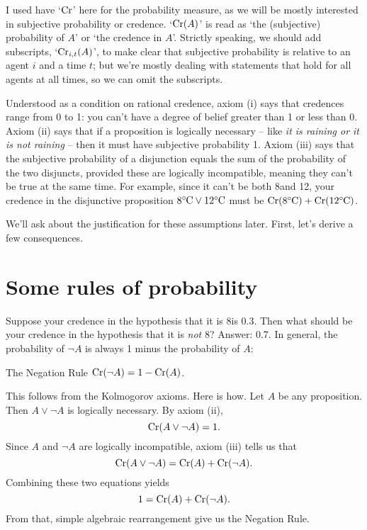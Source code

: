 I used have `$\Cr$' here for the probability measure, as we will be mostly
interested in subjective probability or credence. `$\Cr(A)$' is read as `the
(subjective) probability of $A$' or `the credence in $A$'. Strictly speaking, we
should add subscripts, `$\Cr_{i,t}(A)$', to make clear that subjective
probability is relative to an agent $i$ and a time $t$; but we're mostly dealing
with statements that hold for all agents at all times, so we can omit the
subscripts.

Understood as a condition on rational credence, axiom (i) says that credences
range from 0 to 1: you can't have a degree of belief greater than 1 or less than
0. Axiom (ii) says that if a proposition is logically necessary -- like \emph{it
  is raining or it is not raining} -- then it must have subjective probability
1. Axiom (iii) says that the subjective probability of a disjunction
equals the sum of the probability of the two disjuncts, provided these are
logically incompatible, meaning they can't be true at the same time. For
example, since it can't be both 8\celsius and 12\celsius, your credence in the
disjunctive proposition $8\celsius \lor 12\celsius$ must be
$\Cr(\text{8\celsius}) + \Cr(\text{12\celsius})$.

We'll ask about the justification for these assumptions later. First,
let's derive a few consequences.


\section{Some rules of probability}

Suppose your credence in the hypothesis that it is 8\celsius is
0.3. Then what should be your credence in the hypothesis that it is
\emph{not} 8\celsius? Answer: 0.7. In general, the probability of
$\neg A$ is always 1 minus the probability of $A$:

\begin{genericthm}{The Negation Rule}
  $\Cr(\neg A) = 1 - \Cr(A)$.
\end{genericthm}

This follows from the Kolmogorov axioms. Here is how. Let $A$ be any
proposition. Then $A \lor \neg A$ is logically necessary. By axiom (ii),
\[
  \Cr(A \lor \neg A) = 1.
\]
Since  $A$ and $\neg A$ are logically incompatible, axiom (iii) tells us that
\[
  \Cr(A \lor \neg A) = \Cr(A) + \Cr(\neg A).
\]
Combining these two equations yields
\[
  1 = \Cr(A) + \Cr(\neg A).
\]
From that, simple algebraic rearrangement give us the Negation Rule.

